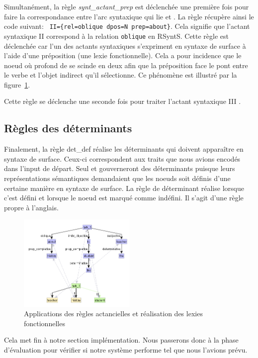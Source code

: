 Simultanément, la règle \emph{synt\_actant\_prep} est déclenchée une première fois pour faire la correspondance entre l'arc syntaxique qui lie  et . La règle récupère ainsi le code suivant: \lstinline! II={rel=oblique dpos=N prep=about}!. Cela signifie que l'actant syntaxique II correspond à la relation \texttt{oblique} en RSyntS. Cette règle est déclenchée car l'un des actants syntaxiques s'expriment en syntaxe de surface à l'aide d'une préposition (une lexie fonctionnelle). Cela a pour incidence que le noe{}ud où profond de  se scinde en deux afin que la préposition  face le pont entre le verbe et l'objet indirect qu'il sélectionne. Ce phénomène est illustré par la figure~\ref{deroulement4}. 

Cette règle se déclenche une seconde fois pour traiter l'actant syntaxique III .

\subsection{Règles des déterminants}
Finalement, la règle det\_def réalise les déterminants qui doivent apparaître en syntaxe de surface. Ceux-ci correspondent aux traits que nous avions encodés dans l'input de départ. Seul  et  gouverneront des déterminants puisque leurs représentations sémantiques demandaient que les noe{}uds soit définis d'une certaine manière en syntaxe de surface. La règle de déterminant réalise  lorsque c'est défini et  lorsque le noe{}ud est marqué comme indéfini. Il s'agit d'une règle propre à l'anglais.
\begin{figure}[htb]
	\centering
	\includegraphics[width=0.5\textwidth, trim = {0cm 0cm 0cm 0cm},clip]{ch6/figs/ssynt.png}
	\caption{Applications des règles actancielles et réalisation des lexies fonctionnelles}
	\label{deroulement4}
\end{figure}
Cela met fin à notre section implémentation. Nous passerons donc à la phase d'évaluation pour vérifier si notre système performe tel que nous l'avions prévu.

